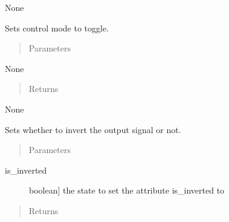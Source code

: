 \documentclass[letterpaper,10pt,english]{sphinxmanual}
\begin{document}
\begin{fulllineitems}
\begin{fulllineitems}
\sphinxAtStartPar
None

\end{fulllineitems}


\begin{fulllineitems}
\label{\detokenize{base:OutputObject.OutputObject.set_control_toggle}}
\sphinxAtStartPar
Sets control mode to toggle.
\begin{quote}\begin{description}
\item[{Parameters}] \leavevmode
\end{description}\end{quote}

\sphinxAtStartPar
None
\begin{quote}\begin{description}
\item[{Returns}] \leavevmode
\end{description}\end{quote}

\sphinxAtStartPar
None

\end{fulllineitems}


\begin{fulllineitems}
\label{\detokenize{base:OutputObject.OutputObject.set_inversion}}
\sphinxAtStartPar
Sets whether to invert the output signal or not.
\begin{quote}\begin{description}
\item[{Parameters}] \leavevmode
\end{description}\end{quote}
\begin{description}
\item[{is\_inverted}] \leavevmode{[}boolean{]}
\sphinxAtStartPar
the state to set the attribute is\_inverted to

\end{description}
\begin{quote}\begin{description}
\item[{Returns}] \leavevmode
\end{description}\end{quote}


\end{fulllineitems}
\end{fulllineitems}
\end{document}
